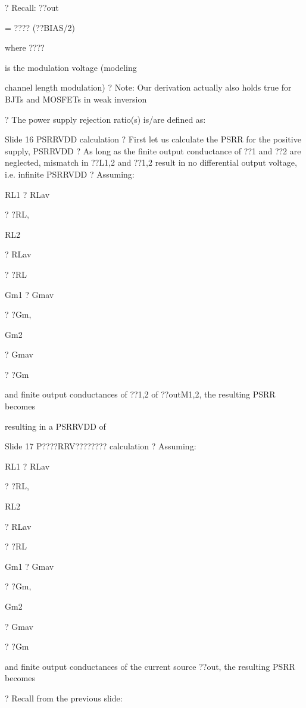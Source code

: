 \documentclass[2pt,landscape]{article}
\begin{document}
\begin{multicols*}{5}
?	Recall: ??out


=	????
(??BIAS/2)


where ????


is the modulation 
voltage 
(modeling


channel length modulation)
?	Note: Our derivation actually also holds true for BJTs and MOSFETs in 
weak inversion




?	The power supply rejection ratio(s) is/are defined as:




Slide 16	PSRRVDD calculation
?	First let us calculate the PSRR for the positive supply, PSRRVDD
?	As long as the finite output conductance of
??1 and ??2 are neglected, mismatch in ??L1,2 
and ??1,2 result in no differential output 
voltage, i.e. infinite PSRRVDD
?	Assuming:



RL1 ? RLav


?	?RL,


RL2


? RLav


?	?RL


Gm1 ? Gmav


?	?Gm,


Gm2


? Gmav


?	?Gm



and finite output conductances of ??1,2
of ??outM1,2, the resulting PSRR becomes

resulting in a PSRRVDD of




Slide 17	P????RRV????????  calculation
?	Assuming:



RL1 ? RLav


?	?RL,


RL2


? RLav


?	?RL


Gm1 ? Gmav


?	?Gm,


Gm2


? Gmav


?	?Gm



and finite output conductances of the current 
source ??out, the resulting PSRR becomes




?	Recall from the previous slide:










\end{multicols*}
\end{document}
